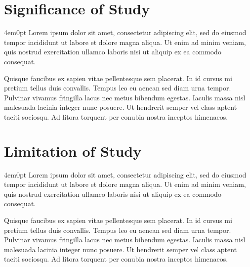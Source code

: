 \section{Significance of Study}
	\begin{indentedblock}{4em}{0pt}
		\fontsize{12pt}{\baselineskip}\selectfont
		Lorem ipsum dolor sit amet, consectetur adipiscing elit, sed do eiusmod tempor incididunt ut labore et dolore magna aliqua. Ut enim ad minim veniam, quis nostrud exercitation ullamco laboris nisi ut aliquip ex ea commodo consequat. 
		
		
		Quisque faucibus ex sapien vitae pellentesque sem placerat. In id cursus mi pretium tellus duis convallis. Tempus leo eu aenean sed diam urna tempor. Pulvinar vivamus fringilla lacus nec metus bibendum egestas. Iaculis massa nisl malesuada lacinia integer nunc posuere. Ut hendrerit semper vel class aptent taciti sociosqu. Ad litora torquent per conubia nostra inceptos himenaeos.
	\end{indentedblock}

\section{Limitation of Study}
	\begin{indentedblock}{4em}{0pt}
		Lorem ipsum dolor sit amet, consectetur adipiscing elit, sed do eiusmod tempor incididunt ut labore et dolore magna aliqua. Ut enim ad minim veniam, quis nostrud exercitation ullamco laboris nisi ut aliquip ex ea commodo consequat. 
		
		
		Quisque faucibus ex sapien vitae pellentesque sem placerat. In id cursus mi pretium tellus duis convallis. Tempus leo eu aenean sed diam urna tempor. Pulvinar vivamus fringilla lacus nec metus bibendum egestas. Iaculis massa nisl malesuada lacinia integer nunc posuere. Ut hendrerit semper vel class aptent taciti sociosqu. Ad litora torquent per conubia nostra inceptos himenaeos.
	\end{indentedblock}

